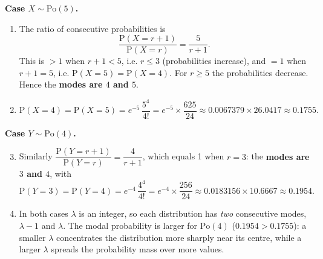 \documentclass[11pt]{article}
\begin{document}
\begin{corrige}
\textbf{Case $X \sim \mathrm{Po}(5)$.}
\begin{enumerate}
\item The ratio of consecutive probabilities is
\[ \frac{\mathrm{P}(X = r+1)}{\mathrm{P}(X = r)} = \frac{5}{r+1}. \]
This is $> 1$ when $r + 1 < 5$, i.e. $r \le 3$ (probabilities increase), and $= 1$ when $r + 1 = 5$, i.e. $\mathrm{P}(X = 5) = \mathrm{P}(X = 4)$. For $r \ge 5$ the probabilities decrease. Hence the \textbf{modes are $4$ and $5$}.
\item 
\[ \mathrm{P}(X = 4) = \mathrm{P}(X = 5) = e^{-5}\,\frac{5^{4}}{4!} = e^{-5} \times \frac{625}{24} \approx 0.0067379 \times 26.0417 \approx 0.1755. \]
\end{enumerate}
\textbf{Case $Y \sim \mathrm{Po}(4)$.}
\begin{enumerate}
\setcounter{enumi}{2}
\item Similarly $\dfrac{\mathrm{P}(Y=r+1)}{\mathrm{P}(Y=r)} = \dfrac{4}{r+1}$, which equals 1 when $r = 3$: the \textbf{modes are $3$ and $4$}, with
\[ \mathrm{P}(Y = 3) = \mathrm{P}(Y = 4) = e^{-4}\,\frac{4^{4}}{4!} = e^{-4} \times \frac{256}{24} \approx 0.0183156 \times 10.6667 \approx 0.1954. \]
\item In both cases $\lambda$ is an integer, so each distribution has \emph{two} consecutive modes, $\lambda - 1$ and $\lambda$. The modal probability is larger for $\mathrm{Po}(4)$ ($0.1954 > 0.1755$): a smaller $\lambda$ concentrates the distribution more sharply near its centre, while a larger $\lambda$ spreads the probability mass over more values.
\end{enumerate}
\end{corrige}
\end{document}
